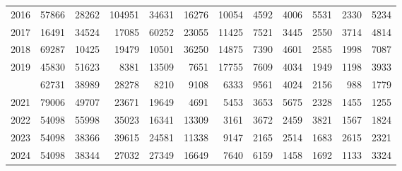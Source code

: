 \documentclass[
]{article}
\begin{document}
\begin{longtable}[t]{lrrrrrrrrrrr}
2016 & 57866 & 28262 & 104951 & 34631 & 16276 & 10054 & 4592 & 4006 & 5531 & 2330 & 5234\\
2017 & 16491 & 34524 & 17085 & 60252 & 23055 & 11425 & 7521 & 3445 & 2550 & 3714 & 4814\\
2018 & 69287 & 10425 & 19479 & 10501 & 36250 & 14875 & 7390 & 4601 & 2585 & 1998 & 7087\\
2019 & 45830 & 51623 & 8381 & 13509 & 7651 & 17755 & 7609 & 4034 & 1949 & 1198 & 3933\\
\addlinespace
2020 & 62731 & 38989 & 28278 & 8210 & 9108 & 6333 & 9561 & 4024 & 2156 & 988 & 1779\\
2021 & 79006 & 49707 & 23671 & 19649 & 4691 & 5453 & 3653 & 5675 & 2328 & 1455 & 1255\\
2022 & 54098 & 55998 & 35023 & 16341 & 13309 & 3161 & 3672 & 2459 & 3821 & 1567 & 1824\\
2023 & 54098 & 38366 & 39615 & 24581 & 11338 & 9147 & 2165 & 2514 & 1683 & 2615 & 2321\\
2024 & 54098 & 38344 & 27032 & 27349 & 16649 & 7640 & 6159 & 1458 & 1692 & 1133 & 3324\\*
\end{longtable}
\end{document}

